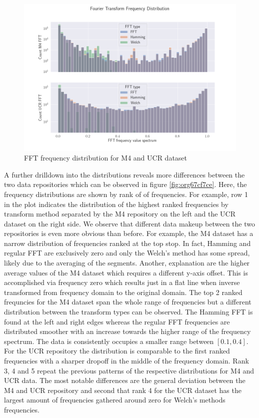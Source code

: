 \documentclass[phd,black, hidelinks]{PrincetonThesis}
\begin{document}
\begin{figure}[htbp]
\centering
\includegraphics[width=.9\linewidth]{./img/fft_freq_dist_ucr_m4.png}
\caption{\label{fig:orge02d9fb}FFT frequency distribution for M4 and UCR dataset}
\end{figure}

A further drilldown into the distributions reveals more differences between the two data repositories which can be observed in figure \ref{fig:org67cf7ce}. Here, the frequency distributions are shown by rank of of frequencies. For example, row 1 in the plot indicates the distribution of the highest ranked frequencies by transform method separated by the M4 repository on the left and the UCR dataset on the right side. We observe that different data makeup between the two repositories is even more obvious than before. For example, the M4 dataset has a narrow distribution of frequencies ranked at the top stop. In fact, Hamming and regular FFT are exclusively zero and only the Welch's method has some spread, likely due to the averaging of the segments. Another, explanation are the higher average values of the M4 dataset which requires a different y-axis offset. This is accomplished via frequency zero which results just in a flat line when inverse transformed from frequency domain to the original domain. The top 2 ranked frequncies for the M4 dataset span the whole range of frequencies but a different distribution between the transform types can be observed. The Hamming FFT is found at the left and right edges whereas the regular FFT frequencies are distributed smoother with an increase towards the higher range of the frequency spectrum. The data is consistently occupies a smaller range between \([0.1,0.4]\). For the UCR repository the distribution is comparable to the first ranked frequencies with a sharper dropoff in the middle of the frequency domain. Rank 3, 4 and 5 repeat the previous patterns of the respective distributions for M4 and UCR data. The most notable differences are the general deviation between the M4 and UCR repository and second that rank 4 for the UCR dataset has the largest amount of frequencies gathered around zero for Welch's methods frequencies.
\end{document}
